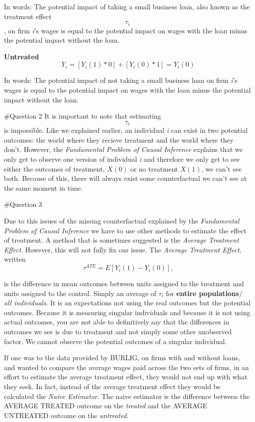 \documentclass[]{article}
\begin{document}
In words: The potential impact of taking a small business loan, also
known as the treatment effect \[\tau_i\] , on firm \emph{i}'s wages is
equal to the potential impact on wages with the loan minus the potential
impact without the loan.

\textbf{Untreated}\\
\[\ Y_i = [Y_i(1) * 0 ]+ [Y_i(0)*1]= Y_i(0) \]

In words: The potential impact of not taking a small business loan on
firm \emph{i}'s wages is equal to the potential impact on wages with the
loan minus the potential impact without the loan.

\#Question 2 It is important to note that estimating \[\tau_i\] is
impossible. Like we explained earlier, an individual \emph{i} can exist
in two potential outcomes: the world where they recieve treatment and
the world where they don't. However, the \emph{Fundamental Problem of
Causal Inference} explains that we only get to observe one version of
individual \emph{i} and therefore we only get to see either the outcomes
of treatment, \(X(0)\) or no treatment \(X(1)\), we can't see both.
Because of this, there will always exist some counterfactual we can't
see at the same moment in time.

\#Question 3

Due to this issues of the missing counterfactual explained by the
\emph{Fundamental Problem of Causal Inference} we have to use other
methods to estimate the effect of treatment. A method that is sometimes
suggested is the \emph{Average Treatment Effect}. However, this will not
fully fix our issue. The \emph{Average Treatment Effect}, written\\
\[\ \tau^{ATE} = E[Y_i(1) - Y_i(0)], \]

is the difference in mean outcomes between units assigned to the
treatment and units assigned to the control. Simply an average of
\(\tau_i\) for \textbf{entire populations}/ \emph{all individuals}. It
is an expectations not using the real outcomes but the potential
outcomes. Because it is measuring singular individuals and because it is
not using actual outcomes, you are not able to definitively say that the
differences in outcomes we see is due to treatment and not simply some
other unobserved factor. We cannot observe the potential outcomes of a
singular individual.

If one was to the data provided by BURLIG, on firms with and without
loans, and wanted to compare the average wages paid across the two sets
of firms, in an effort to estimate the average treatment effect, they
would not end up with what they seek. In fact, instead of the average
treatment effect they would be calculated the \emph{Naive Estimator}.
The naive estimator is the difference between the AVERAGE TREATED
outcome on the \emph{treated} and the AVERAGE UNTREATED outcome on the
\emph{untreated}.
\end{document}
